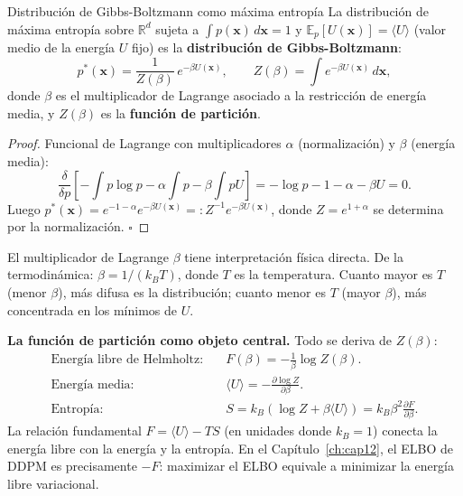 \begin{teorema}{Distribución de Gibbs-Boltzmann como máxima entropía}
\label{thm:ap_jaynes}
La distribución de máxima entropía sobre $\mathbb{R}^d$ sujeta a
$\int p(\bm{x})\,d\bm{x} = 1$ y $\mathbb{E}_p[U(\bm{x})] = \langle U\rangle$
(valor medio de la energía $U$ fijo) es la \textbf{distribución de
Gibbs-Boltzmann}:
\begin{equation}
  p^*(\bm{x}) = \frac{1}{Z(\beta)}\,e^{-\beta U(\bm{x})},
  \qquad Z(\beta) = \int e^{-\beta U(\bm{x})}\,d\bm{x},
  \label{eq:ap_gibbs}
\end{equation}
donde $\beta$ es el multiplicador de Lagrange asociado a la restricción de
energía media, y $Z(\beta)$ es la \textbf{función de partición}.
\end{teorema}

\begin{proof}
Funcional de Lagrange con multiplicadores $\alpha$ (normalización) y $\beta$
(energía media):
\[
  \frac{\delta}{\delta p}\left[-\int p\log p - \alpha\!\int p - \beta\!\int pU\right]
  = -\log p - 1 - \alpha - \beta U = 0.
\]
Luego $p^*(\bm{x}) = e^{-1-\alpha}e^{-\beta U(\bm{x})} =: Z^{-1}e^{-\beta U(\bm{x})}$,
donde $Z = e^{1+\alpha}$ se determina por la normalización. $\square$
\end{proof}

El multiplicador de Lagrange $\beta$ tiene interpretación física directa. De la
termodinámica: $\beta = 1/(k_BT)$, donde $T$ es la temperatura. Cuanto mayor es
$T$ (menor $\beta$), más difusa es la distribución; cuanto menor es $T$ (mayor
$\beta$), más concentrada en los mínimos de $U$.

\medskip\noindent\textbf{La función de partición como objeto central.}
Todo se deriva de $Z(\beta)$:
\begin{align}
  \text{Energía libre de Helmholtz:}&\quad
    F(\beta) = -\frac{1}{\beta}\log Z(\beta). \label{eq:ap_helmholtz}\\
  \text{Energía media:}&\quad
    \langle U\rangle = -\frac{\partial\log Z}{\partial\beta}. \label{eq:ap_U}\\
  \text{Entropía:}&\quad
    S = k_B(\log Z + \beta\langle U\rangle) = k_B\beta^2\frac{\partial F}{\partial\beta}.
    \label{eq:ap_S}
\end{align}
La relación fundamental $F = \langle U\rangle - TS$ (en unidades donde $k_B=1$)
conecta la energía libre con la energía y la entropía. En el
Capítulo~\ref{ch:cap12}, el ELBO de DDPM es precisamente $-F$: maximizar el
ELBO equivale a minimizar la energía libre variacional.

